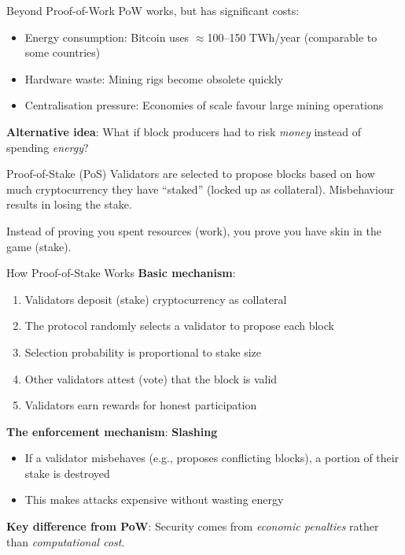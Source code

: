 \documentclass[10pt]{beamer}
\newcommand{\highlight}[1]{\textcolor{AccentOrange}{\textbf{#1}}}
\newcommand{\bad}[1]{\textcolor{AccentOrange}{#1}}
\begin{document}
\begin{frame}{Beyond Proof-of-Work}
  PoW works, but has significant costs:
  
  \vspace{0.5em}
  \begin{itemize}
    \item \bad{Energy consumption}: Bitcoin uses $\approx$100--150 TWh/year (comparable to some countries)
    \item \bad{Hardware waste}: Mining rigs become obsolete quickly
    \item \bad{Centralisation pressure}: Economies of scale favour large mining operations
  \end{itemize}
  
  \vspace{1em}
  \textbf{Alternative idea}: What if block producers had to risk \textit{money} instead of spending \textit{energy}?
  
  \vspace{1em}
  \begin{block}{Proof-of-Stake (PoS)}
    Validators are selected to propose blocks based on how much cryptocurrency they have ``staked'' (locked up as collateral). Misbehaviour results in losing the stake.
  \end{block}
  
  \vspace{0.5em}
  Instead of proving you spent resources (work), you prove you have skin in the game (stake).
\end{frame}

\begin{frame}{How Proof-of-Stake Works}
  \textbf{Basic mechanism}:
  \begin{enumerate}
    \item Validators deposit (stake) cryptocurrency as collateral
    \item The protocol randomly selects a validator to propose each block
    \item Selection probability is proportional to stake size
    \item Other validators attest (vote) that the block is valid
    \item Validators earn rewards for honest participation
  \end{enumerate}
  
  \vspace{1em}
  \textbf{The enforcement mechanism}: \highlight{Slashing}
  \begin{itemize}
    \item If a validator misbehaves (e.g., proposes conflicting blocks), a portion of their stake is destroyed
    \item This makes attacks expensive without wasting energy
  \end{itemize}
  
  \vspace{1em}
  \textbf{Key difference from PoW}: Security comes from \textit{economic penalties} rather than \textit{computational cost}.
\end{frame}
\end{document}

